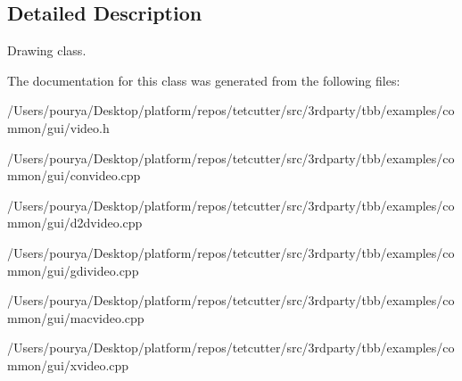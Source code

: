 \subsection{Detailed Description}
Drawing class. 

The documentation for this class was generated from the following files\+:\begin{DoxyCompactItemize}
\item 
/\+Users/pourya/\+Desktop/platform/repos/tetcutter/src/3rdparty/tbb/examples/common/gui/video.\+h\item 
/\+Users/pourya/\+Desktop/platform/repos/tetcutter/src/3rdparty/tbb/examples/common/gui/convideo.\+cpp\item 
/\+Users/pourya/\+Desktop/platform/repos/tetcutter/src/3rdparty/tbb/examples/common/gui/d2dvideo.\+cpp\item 
/\+Users/pourya/\+Desktop/platform/repos/tetcutter/src/3rdparty/tbb/examples/common/gui/gdivideo.\+cpp\item 
/\+Users/pourya/\+Desktop/platform/repos/tetcutter/src/3rdparty/tbb/examples/common/gui/macvideo.\+cpp\item 
/\+Users/pourya/\+Desktop/platform/repos/tetcutter/src/3rdparty/tbb/examples/common/gui/xvideo.\+cpp\end{DoxyCompactItemize}
